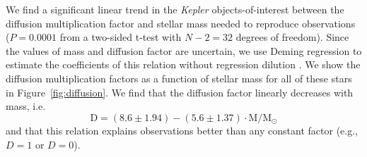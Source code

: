 We find a significant linear trend in the \emph{Kepler} objects-of-interest between the diffusion multiplication factor and stellar mass needed to reproduce observations (${P = 0.0001}$ from a two-sided t-test with ${N-2=32}$ degrees of freedom). Since the values of mass and diffusion  factor are uncertain, we use Deming regression to estimate the coefficients of this relation without regression dilution \citep{deming1943statistical}. We show the diffusion multiplication factors as a function of stellar mass for all of these stars in Figure~\ref{fig:diffusion}. We find that the diffusion  factor linearly decreases with mass, i.e.\ 
\begin{equation} \label{eq:diffusion}
    \text{D} = ( 8.6 \pm 1.94 ) - ( 5.6 \pm 1.37 ) \cdot \text{M}/\text{M}_\odot
\end{equation}
and that this relation explains observations better than any constant factor (e.g., ${D=1}$ or ${D=0}$). 

